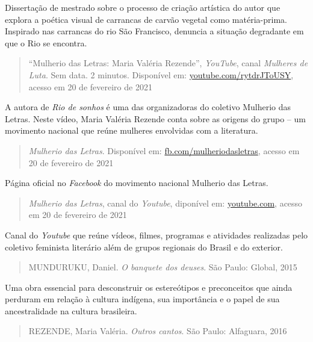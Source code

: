 \documentclass[12pt]{extarticle}
\begin{document}
    Dissertação de mestrado sobre o processo de criação artística do
    autor que explora a poética visual de carrancas de carvão vegetal
    como matéria-prima. Inspirado nas carrancas do rio São Francisco,
    denuncia a situação degradante em que o Rio se encontra.

    \begin{quote}
    ``Mulherio das Letras: Maria Valéria Rezende'', \emph{YouTube},
    canal \emph{Mulheres de Luta}. Sem data. 2 minutos. Disponível em:
    \href{https://www.youtube.com/watch?v=rytdrJToUSY\&feature=emb_logo}{youtube.com/rytdrJToUSY},
    acesso em 20 de fevereiro de 2021
    \end{quote}

    A autora de \emph{Rio de sonhos} é uma das organizadoras do coletivo
    Mulherio das Letras. Neste vídeo, Maria Valéria Rezende conta sobre
    as origens do grupo -- um movimento nacional que reúne mulheres
    envolvidas com a literatura.

    \begin{quote}
    \emph{Mulherio das Letras}. Disponível em:
    \href{https://pt-br.facebook.com/mulheriodasletras/}{fb.com/mulheriodasletras},
    acesso em 20 de fevereiro de 2021
    \end{quote}

    Página oficial no \emph{Facebook} do movimento nacional Mulherio das
    Letras.

    \begin{quote}
    \emph{Mulherio das Letras}, canal do \emph{Youtube}, diponível em:
    \href{https://www.youtube.com/channel/UCzOwcQ9fdT5GmD8IJR_21SA/videos}{youtube.com},
    acesso em 20 de fevereiro de 2021
    \end{quote}

    Canal do \emph{Youtube} que reúne vídeos, filmes, programas e
    atividades realizadas pelo coletivo feminista literário além de
    grupos regionais do Brasil e do exterior.

    \begin{quote}
    MUNDURUKU, Daniel. \emph{O banquete dos deuses}. São Paulo: Global,
    2015
    \end{quote}

    Uma obra essencial para desconstruir os estereótipos e preconceitos
    que ainda perduram em relação à cultura indígena, sua importância e
    o papel de sua ancestralidade na cultura brasileira.

    \begin{quote}
    REZENDE, Maria Valéria. \emph{Outros cantos}. São Paulo: Alfaguara,
    2016
    \end{quote}
\end{document}
